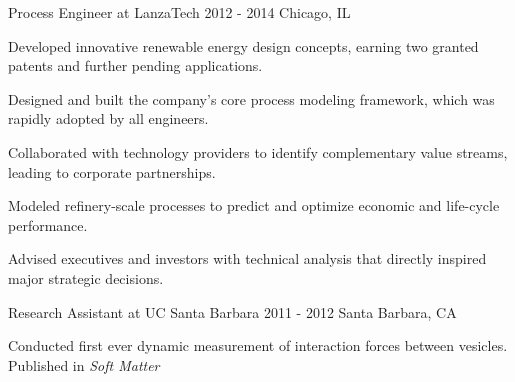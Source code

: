 \begin{cventries}
  \cventrynew
    {Process Engineer at LanzaTech} 
    {2012 - 2014} 
    {Chicago, IL} 
    {
      \begin{cvitems}
        \item {Developed innovative renewable energy design concepts, earning two granted patents and further pending applications.}
		\item {Designed and built the company's core process modeling framework, which was rapidly adopted by all engineers.}        
		\item {Collaborated with technology providers to identify complementary value streams, leading to corporate partnerships.}
        \item {Modeled refinery-scale processes to predict and optimize economic and life-cycle performance.}        
        \item {Advised executives and investors with technical analysis that directly inspired major strategic decisions.}
      \end{cvitems}
    }
    
  \cventryshort
    {Research Assistant at UC Santa Barbara}
    {2011 - 2012}
    {Santa Barbara, CA}         
    {
      \begin{cvitems} 
        \item {Conducted first ever dynamic measurement of interaction forces between vesicles. Published in \emph{Soft Matter}}        
      \end{cvitems}
    }   
  



\end{cventries}
